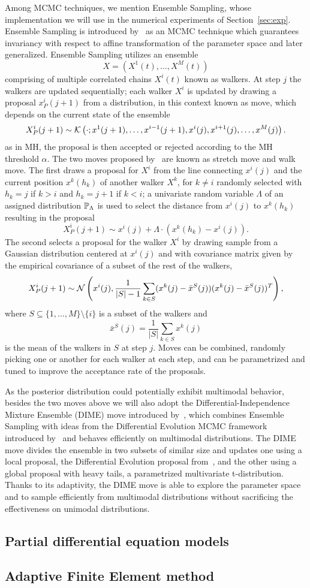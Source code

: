 Among MCMC techniques, we mention Ensemble Sampling, whose implementation we will use in the numerical experiments of Section~\ref{sec:exp}.
Ensemble Sampling is introduced by~\cite{GoodmanWeare} as an MCMC technique which guarantees invariancy with respect to affine transformation of the parameter space and later generalized.
Ensemble Sampling utilizes an ensemble 
\[
X =(X^1(t), \dots , X^M(t))
\] 
comprising of multiple correlated chains $X^i(t)$ known as walkers.
At step $j$ the walkers are updated sequentially; each walker $X^i$ is updated by drawing a proposal $x^i_P(j+1)$ from a distribution, in this context known as move, which depends on the current state of the ensemble 
\[
  X^i_P(j+1) \sim \mathcal K\left( \cdot ; x^1(j+1), \dots, x^{i-1}(j+1), x^i(j), x^{i+1}(j), \dots, x^M(j)\right).
\] as in MH, the proposal is then accepted or rejected according to the MH threshold $\alpha$. \newline
The two moves proposed by~\cite{GoodmanWeare} are known as stretch move and walk move.
The first draws a proposal for $X^i$ from the line connecting $x^i(j)$ and the current position $x^k(h_k)$ of another walker $X^k$, for $k \neq i$ randomly selected with $h_k = j$ if $k > i$ and $h_k = j+1$ if $k < i$; a univariate random variable $\Lambda$ of an assigned distribution $\mathbb P_\Lambda$ is used to select the distance from $x^i(j)$ to $x^k(h_k)$ resulting in the proposal
\[
    X^i_P(j+1) \sim x^i(j) + \Lambda \cdot (x^k(h_k) - x^i(j)).
\]
The second selects a proposal for the walker $X^i$ by drawing sample from a Gaussian distribution centered at $x^i(j)$ and with covariance matrix given by the empirical covariance of a subset of the rest of the walkers,
\[
    X^i_P(j+1) \sim \mathcal N\left( x^i(j), \frac{1}{|S|-1} \sum_{k \in S} (x^k(j) - \bar x^S(j))(x^k(j) - \bar x^S(j))^T \right),
\]
where $S \subseteq \{1, \dots, M\} \setminus \{i\}$ is a subset of the walkers and \[\bar x^S(j) = \frac{1}{|S|}\sum_{k \in S} x^k(j)\] is the mean of the walkers in $S$ at step $j$.
Moves can be combined, randomly picking one or another for each walker at each step, and can be parametrized and tuned to improve the acceptance rate of the proposals.

As the posterior distribution could potentially exhibit multimodal behavior, besides the two moves above we will also adopt the Differential-Independence Mixture Ensemble (DIME) move introduced by~\cite{Boehl}, which combines Ensemble Sampling with ideas from the Differential Evolution MCMC framework introduced by~\cite{TerBraak} and behaves efficiently on multimodal distributions. 
The DIME move divides the ensemble in two subsets of similar size and updates one using a local proposal, the Differential Evolution proposal from~\cite{TerBraak}, and the other using a global proposal with heavy tails, a parametrized multivariate t-distribution.
Thanks to its adaptivity, the DIME move is able to explore the parameter space and to sample efficiently from multimodal distributions without sacrificing the effectiveness on unimodal distributions.

\subsection{Partial differential equation models} \label{sec:PDE}

\subsection{Adaptive Finite Element method} \label{sec:AdaFE}